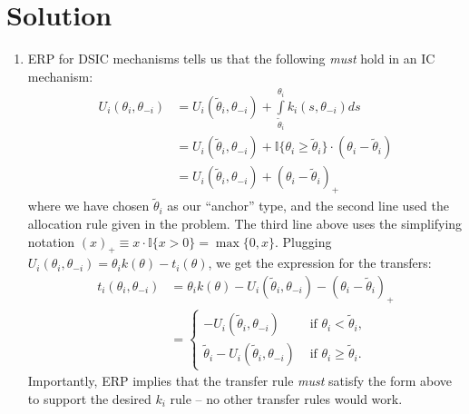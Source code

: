 \documentclass[a4paper]{article}
\newif\ifsolutions
\begin{document}
\ifsolutions
\section*{Solution}

\begin{enumerate}
	\item ERP for DSIC mechanisms tells us that the following \emph{must} hold in an IC mechanism:
	\begin{align*}
		U_i(\theta_i,\theta_{-i}) 
		&= U_i(\tilde{\theta}_i, \theta_{-i}) + \int\limits_{\tilde{\theta}_i}^{\theta_i} k_i(s,\theta_{-i}) ds
		\\
		&= U_i(\tilde{\theta}_i, \theta_{-i}) + \mathbb{I}\{\theta_i \geq \tilde{\theta}_i \} \cdot (\theta_i - \tilde{\theta}_i)
		\\
		&= U_i(\tilde{\theta}_i, \theta_{-i}) + (\theta_i - \tilde{\theta}_i)_+
	\end{align*}
	where we have chosen $\tilde{\theta}_i$ as our ``anchor'' type, and the second line used the allocation rule given in the problem. The third line above uses the simplifying notation $(x)_+ \equiv x \cdot \mathbb{I}\{x > 0\} = \max \{0, x\}$. Plugging $U_i(\theta_i,\theta_{-i}) = \theta_i k(\theta) - t_i(\theta)$, we get the expression for the transfers:
	\begin{align*}
		t_i(\theta_i, \theta_{-i}) 
		&= \theta_i k(\theta) - U_i(\tilde{\theta}_i, \theta_{-i}) - (\theta_i - \tilde{\theta}_i)_+
		\\
		&= \begin{cases}
			- U_i(\tilde{\theta}_i, \theta_{-i}) & \text{ if } \theta_i < \tilde{\theta}_i,
			\\
			\tilde{\theta}_i - U_i(\tilde{\theta}_i, \theta_{-i}) & \text{ if } \theta_i \geq \tilde{\theta}_i.
		\end{cases}
	\end{align*}
	Importantly, ERP implies that the transfer rule \emph{must} satisfy the form above to support the desired $k_i$ rule -- no other transfer rules would work.
	

\end{enumerate}
\end{document}
